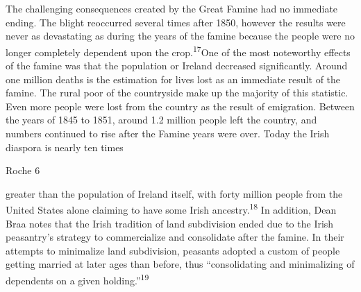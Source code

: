 \begin{Spacing}{1.5}
\hspace{.4in}The challenging consequences created by the Great Famine had no immediate ending. The blight reoccurred several times after 1850, however the results were never as devastating as during the years of the famine because the people were no longer completely dependent upon the crop.\textsuperscript{17}One of the most noteworthy effects of the famine was that the population or Ireland decreased significantly. Around one million deaths is the estimation for lives lost as an immediate result of the famine. The rural poor of the countryside make up the majority of this statistic. Even more people were lost from the country as the result of emigration. Between the years of 1845 to 1851, around 1.2 million people left the country, and numbers continued to rise after the Famine years were over. Today the Irish diaspora is nearly ten times 

\newpage
\thispagestyle{empty}
\begin{flushright}Roche 6\end{flushright}

greater than the population of Ireland itself, with forty million people from the United States alone claiming to have some Irish ancestry.\textsuperscript{18} In addition, Dean Braa notes that the Irish tradition of land subdivision ended due to the Irish peasantry’s strategy to commercialize and consolidate after the famine. In their attempts to minimalize land subdivision, peasants adopted a custom of people getting married at later ages than before, thus “consolidating and minimalizing of dependents on a given holding.”\textsuperscript{19} 


\end{Spacing}
